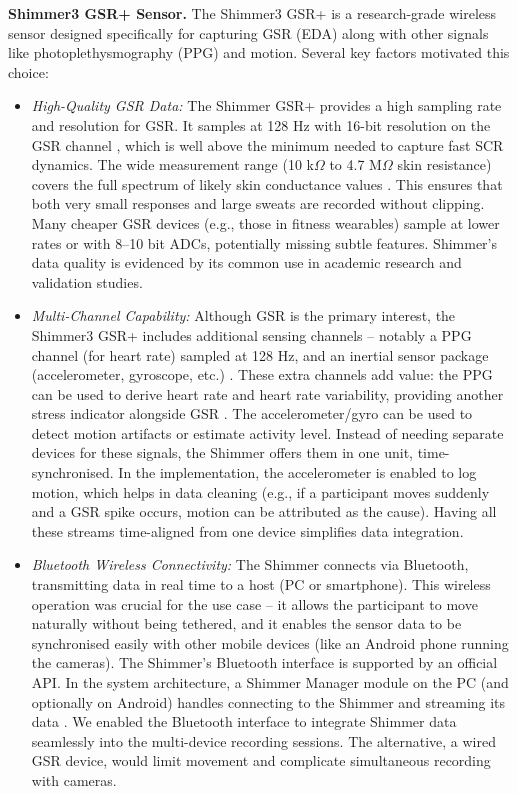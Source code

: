 \textbf{Shimmer3 GSR+ Sensor.} The Shimmer3 GSR+ is a research-grade wireless sensor designed specifically for capturing GSR (EDA) along with other signals like photoplethysmography (PPG) and motion. Several key factors motivated this choice:
\begin{itemize}
  \item \emph{High-Quality GSR Data:} The Shimmer GSR+ provides a high sampling rate and resolution for GSR. It samples at 128 Hz with 16-bit resolution on the GSR channel \cite{ref8}, which is well above the minimum needed to capture fast SCR dynamics. The wide measurement range (10 k$\Omega$ to 4.7 M$\Omega$ skin resistance) covers the full spectrum of likely skin conductance values \cite{ref8}. This ensures that both very small responses and large sweats are recorded without clipping. Many cheaper GSR devices (e.g., those in fitness wearables) sample at lower rates or with 8--10 bit ADCs, potentially missing subtle features. Shimmer's data quality is evidenced by its common use in academic research and validation studies.
  \item \emph{Multi-Channel Capability:} Although GSR is the primary interest, the Shimmer3 GSR+ includes additional sensing channels -- notably a PPG channel (for heart rate) sampled at 128 Hz, and an inertial sensor package (accelerometer, gyroscope, etc.) \cite{ref15}. These extra channels add value: the PPG can be used to derive heart rate and heart rate variability, providing another stress indicator alongside GSR \cite{ref15}. The accelerometer/gyro can be used to detect motion artifacts or estimate activity level. Instead of needing separate devices for these signals, the Shimmer offers them in one unit, time-synchronised. In the implementation, the accelerometer is enabled to log motion, which helps in data cleaning (e.g., if a participant moves suddenly and a GSR spike occurs, motion can be attributed as the cause). Having all these streams time-aligned from one device simplifies data integration.
  \item \emph{Bluetooth Wireless Connectivity:} The Shimmer connects via Bluetooth, transmitting data in real time to a host (PC or smartphone). This wireless operation was crucial for the use case -- it allows the participant to move naturally without being tethered, and it enables the sensor data to be synchronised easily with other mobile devices (like an Android phone running the cameras). The Shimmer's Bluetooth interface is supported by an official API. In the system architecture, a Shimmer Manager module on the PC (and optionally on Android) handles connecting to the Shimmer and streaming its data \cite{ref15}. We enabled the Bluetooth interface to integrate Shimmer data seamlessly into the multi-device recording sessions. The alternative, a wired GSR device, would limit movement and complicate simultaneous recording with cameras.

\end{itemize}
